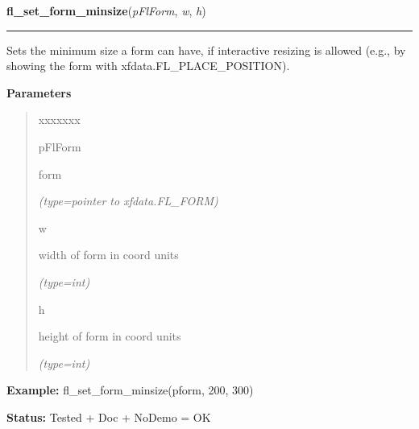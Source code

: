     \vspace{0.5ex}

\hspace{.8\funcindent}\begin{boxedminipage}{\funcwidth}

    \raggedright \textbf{fl\_set\_form\_minsize}(\textit{pFlForm}, \textit{w}, \textit{h})

    \vspace{-1.5ex}

    \rule{\textwidth}{0.5\fboxrule}
\setlength{\parskip}{2ex}
    Sets the minimum size a form can have, if interactive resizing is 
    allowed (e.g., by showing the form with xfdata.FL\_PLACE\_POSITION).

\setlength{\parskip}{1ex}
      \textbf{Parameters}
      \vspace{-1ex}

      \begin{quote}
        \begin{Ventry}{xxxxxxx}

          \item[pFlForm]

          form

            {\it (type=pointer to xfdata.FL\_FORM)}

          \item[w]

          width of form in coord units

            {\it (type=int)}

          \item[h]

          height of form in coord units

            {\it (type=int)}

        \end{Ventry}

      \end{quote}

\textbf{Example:} fl\_set\_form\_minsize(pform, 200, 300)



\textbf{Status:} Tested + Doc + NoDemo = OK



    \end{boxedminipage}

    \label{xformslib:flbasic:fl_set_form_maxsize}

